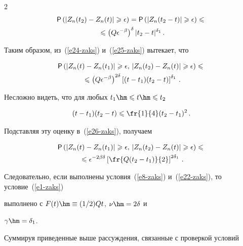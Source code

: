 \begin{multicols}{2}
\begin{multline}

{\sf P}\left(|Z_n(t_2)-Z_n(t)|\geqslant\epsilon\right)={\sf P}\left(|Z_n(t_2-t)|\geqslant\epsilon\right)\leqslant{}\\

{}\leqslant

\left(Q\epsilon^{-\beta}\right)^{\delta}|t_2-t|^{\delta_1}\,.\label{e25-zaks}

\end{multline}

Таким образом, из~(\ref{e24-zaks}) и~(\ref{e25-zaks}) вытекает, что

\begin{multline}

{\sf P}\left(|Z_n(t)-Z_n(t_1)|\geqslant\epsilon,\,|Z_n(t_2)-Z_n(t)|\geqslant\epsilon\right)\leqslant{}\\

{}\leqslant

\left(Q\epsilon^{-\beta}\right)^{2\delta}\left[(t-t_1)(t_2-t)\right]^{\delta_1}\,.\label{e26-zaks}

\end{multline}

Несложно видеть, что для любых $t_1\hm\leqslant t\hm\leqslant t_2$

$$

(t-t_1)(t_2-t)\leqslant\fr{1}{4}(t_2-t_1)^2\,.

$$

Подставляя эту оценку в~(\ref{e26-zaks}), получаем

\begin{multline*}

{\sf P}\left(|Z_n(t)-Z_n(t_1)|\geqslant\epsilon,\,|Z_n(t_2)-Z_n(t)|\geqslant\epsilon\right)\leqslant{}\\

{}\leqslant

\epsilon^{-2\beta\delta}\left[\fr{Q(t_2-t_1)}{2}\right]^{2\delta_1}\,.

\end{multline*}

Следовательно, если выполнены условия~(\ref{e8-zaks}) и~(\ref{e22-zaks}), то условие~(\ref{e1-zaks})

выполнено с $F(t)\hm\equiv (1/2)Qt$, $\nu\hm=2\delta$ и

$\gamma\hm=\delta_1$.





Суммируя приведенные выше рассуждения, связанные с проверкой условий


\end{multicols}

